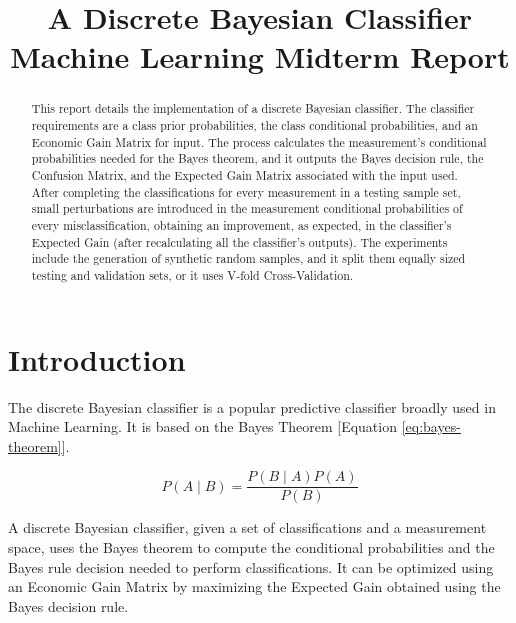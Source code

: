 \documentclass[letterpaper, conference]{IEEEtran}
\begin{document}
\title{A Discrete Bayesian Classifier \\
  \large Machine Learning Midterm Report}

\author{
}

\maketitle

\begin{abstract}

This report details the implementation of a discrete Bayesian classifier. The classifier requirements are a class prior probabilities, the class conditional probabilities, and an Economic Gain Matrix for input. The process calculates the measurement's conditional probabilities needed for the Bayes theorem, and it outputs the Bayes decision rule, the Confusion Matrix, and the Expected Gain Matrix associated with the input used. After completing the classifications for every measurement in a testing sample set, small perturbations are introduced in the measurement conditional probabilities of every misclassification, obtaining an improvement, as expected, in the classifier's Expected Gain (after recalculating all the classifier's outputs). The experiments include the generation of synthetic random samples, and it split them equally sized testing and validation sets, or it uses V-fold Cross-Validation.

\end{abstract}

\section{Introduction}


The discrete Bayesian classifier is a popular predictive classifier broadly used in Machine Learning. It is based on the Bayes Theorem [Equation \ref{eq:bayes-theorem}].

\begin{equation}\label{eq:bayes-theorem}
  P(A \mid B) = \frac{P(B \mid A)\mathbin{}P(A)}{P(B)}
\end{equation}

A discrete Bayesian classifier, given a set of classifications and a measurement space, uses the Bayes theorem to compute the conditional probabilities and the Bayes rule decision needed to perform classifications. It can be optimized using an Economic Gain Matrix by maximizing the Expected Gain obtained using the Bayes decision rule.
\end{document}
